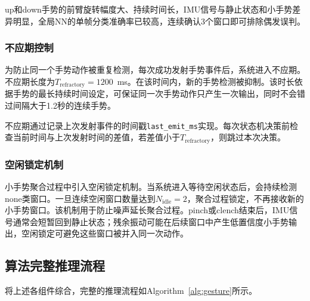 \documentclass[lettersize,journal]{IEEEtran}
\begin{document}
up和down手势的前臂旋转幅度大、持续时间长，IMU信号与静止状态和小手势差异明显，全局NN的单帧分类准确率已较高，连续确认3个窗口即可排除偶发误判。

\subsubsection{不应期控制}

为防止同一个手势动作被重复检测，每次成功发射手势事件后，系统进入不应期。不应期长度为$T_\mathrm{refractory} = 1200$~ms。在该时间内，新的手势检测被抑制。该时长依据手势的最长持续时间设定，可保证同一次手势动作只产生一次输出，同时不会错过间隔大于1.2秒的连续手势。

不应期通过记录上次发射事件的时间戳\texttt{last\_emit\_ms}实现。每次状态机决策前检查当前时间与上次发射时间的差值，若差值小于$T_\mathrm{refractory}$，则跳过本次决策。

\subsubsection{空闲锁定机制}

小手势聚合过程中引入空闲锁定机制。当系统进入等待空闲状态后，会持续检测none类窗口。一旦连续空闲窗口数量达到$N_\mathrm{idle}=2$，聚合过程锁定，不再接收新的小手势窗口。该机制用于防止噪声延长聚合过程。pinch或clench结束后，IMU信号通常会短暂回到静止状态；残余振动可能在后续窗口中产生低置信度小手势输出，空闲锁定可避免这些窗口被并入同一次动作。

\subsection{算法完整推理流程}

将上述各组件综合，完整的推理流程如Algorithm~\ref{alg:gesture}所示。
\end{document}
